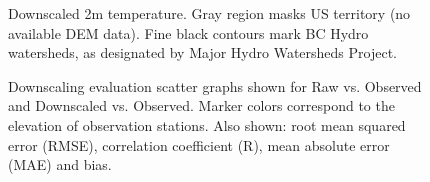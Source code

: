 \documentclass{article}
\begin{document}
\begin{landscape}
\begin{figure}
\caption{Downscaled 2m temperature. Gray region masks US territory (no available DEM data). Fine black contours mark BC Hydro watersheds, as designated by Major Hydro Watersheds Project.}\label{fig:downscaledT}
\end{figure}

\begin{figure}
\caption{Downscaling evaluation scatter graphs shown for Raw vs. Observed and Downscaled vs. Observed. Marker colors correspond to the elevation of observation stations. Also shown: root mean squared error (RMSE), correlation coefficient (R), mean absolute error (MAE) and bias.}\label{fig:verifDS}
\end{figure}


\end{landscape}
\end{document}
